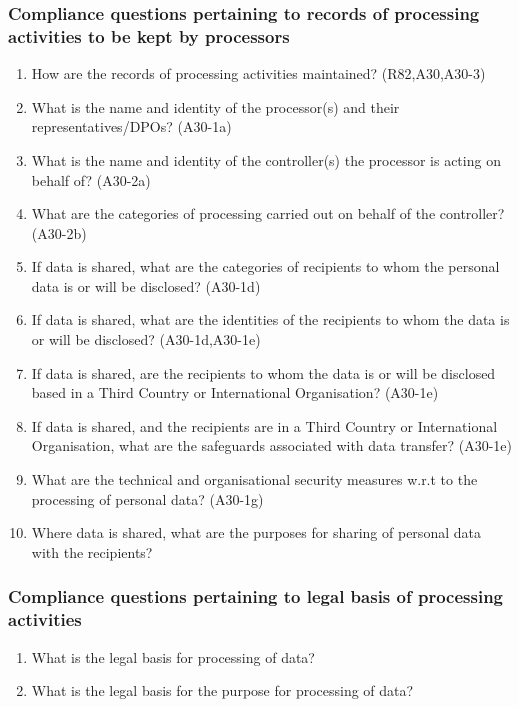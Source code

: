 \subsubsection{Compliance questions pertaining to records of processing activities to be kept by processors}\label{sec:info:CQ:2}
\begin{enumerate}[label={\textit{CMQ.\theenumi}},resume]
    \item How are the records of processing activities maintained? (R82,A30,A30-3)
    \item What is the name and identity of the processor(s) and their representatives/DPOs? (A30-1a)
    \item What is the name and identity of the controller(s) the processor is acting on behalf of? (A30-2a)
    \item What are the categories of processing carried out on behalf of the controller? (A30-2b)
    \item If data is shared, what are the categories of recipients to whom the personal data is or will be disclosed? (A30-1d)
    \item If data is shared, what are the identities of the recipients to whom the data is or will be disclosed? (A30-1d,A30-1e)
    \item If data is shared, are the recipients to whom the data is or will be disclosed based in a Third Country or International Organisation? (A30-1e)
    \item If data is shared, and the recipients are in a Third Country or International Organisation, what are the safeguards associated with data transfer? (A30-1e)
    \item What are the technical and organisational security measures w.r.t to the processing of personal data? (A30-1g)
    \item Where data is shared, what are the purposes for sharing of personal data with the recipients?
\end{enumerate}
\subsubsection{Compliance questions pertaining to legal basis of processing activities}\label{sec:info:CQ:3}
\begin{enumerate}[label={\textit{CMQ.\theenumi}},resume]
    \item What is the legal basis for processing of data?
    \item What is the legal basis for the purpose for processing of data?
\end{enumerate}

